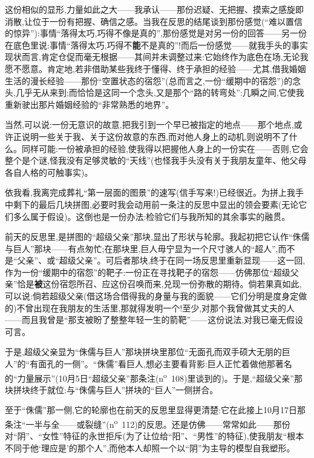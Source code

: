 这份相似的显形,力量如此之大——我承认——那份迟疑、无把握、摸索之感旋即消散,让位于一份有把握、确信之感。当我在反思的结尾谈到那份感觉(“难以置信的惊异”):事情“落得太巧,巧得不像是真的”,那份感觉是对另一份的回答——另一份在底色里说:事情“落得太巧,巧得不\textbf{能}不是真的”!而后一份感觉——就我手头的事实现状而言,肯定仓促而毫无根据——其间并未调整过来:它始终作为底色在场,无论我愿不愿意。肯定地,若非借助某些我终于懂得、终于承担的经验——尤其,借我婚姻生活的漫长经验——那份“空置状态的宿怨”(总而言之,一份“缓期中的宿怨”)的念头,几乎无从来到;而恰恰是这同一个念头,又是那个“路的转弯处”:几瞬之间,它使我重新驶出那片婚姻经验的“非常熟悉的地界”。

\dmark{}当然,可以说:一份无意识的故意,把我引到一个早已被指定的地点——那个地点,或许正说明一些关于我、关于这份故意的东西,而对他人身上的动机,则说明不了什么。同样可能:一份被承担的经验,使我得以把握他人身上的一份实在——否则,它会整个是个谜,怪我没有足够灵敏的“天线”(也怪我手头没有关于我朋友童年、他父母各自人格的可触事实)。

依我看,我离完成葬礼“第一层面的图景”的速写(信手写来!)已经很近。为拼上我手中剩下的最后几块拼图,必要时我会动用前一条注的反思中显出的领会要素(无论它们多么属于假设)。这倒也是一份办法:检验它们与我所知的其余事实的融贯。

前天的反思里,是拼图的“超级父亲”那块,显出了形状与轮廓。我起初把它认作“侏儒与巨人”那块——有点匆忙;在那块里,巨人毋宁显为一个尺寸骇人的“超人”,而不是“父亲”、或“超级父亲”。可后者那块,终于在同一场反思里重新显现——这一回,作为一份“缓期中的宿怨”的靶子:一份正在寻找靶子的宿怨——仿佛那位“超级父亲”恰是\textbf{被}这份宿怨所召、应这份召唤而来,兑现一份弥散的期待。倘若果真如此,可以说:倘若超级父亲(借这场合借得我的身量与我的面貌——它们分明是度身定做的)不曾出现在我朋友的生活里,那就得发明一个!至少,对那个我曾做其丈夫的人——而且我曾是“那支被盼了整整年轻一生的箭靶”——这份说法,对我已毫无假设可言。

于是,超级父亲显为“侏儒与巨人”那块拼块里那位“无面孔而双手硕大无朋的巨人”的“有面孔的一侧”。“侏儒”看巨人,想必主要看背影:巨人正忙着做他那著名的“力量展示”(10月5日“超级父亲”那条注(n\textsuperscript{o}~108)里谈到的)。于是,“超级父亲”那块拼块终于就位:与“侏儒与巨人”拼块的“巨人”一侧拼合。

至于“侏儒”那一侧,它的轮廓也在前天的反思里显得更清楚:它在此接上10月17日那条注“一半与全——或裂缝”(n\textsuperscript{o}~112)的反思。还是仿佛——常常如此——那份对“阴”、“女性”特征的永世拒斥(为了让位给“阳”、“男性”的特征),使我朋友“根本不同于他‘理应是’的那个人”,而他本人却照一个以“阴”为主导的模型自我塑形\dmark{}。

